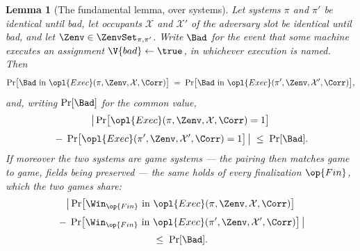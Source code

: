 \documentclass[10pt,oneside,openany]{book}
\theoremstyle{accentdef}
\theoremstyle{accentplain}
\newtheorem{lemma}[definition]{Lemma}
\begin{document}
\begin{lemma}[The fundamental lemma, over systems]\label{lem:iub}
Let systems $\pi$ and $\pi'$ be identical until bad, let occupants $\mathcal{X}$ and
$\mathcal{X}'$ of the adversary slot be identical until bad, and let
$\Zenv \in \ZenvSet_{\pi,\pi'}$. Write $\Bad$ for the event that some machine executes an
assignment $\V{bad} \gets \true$, in whichever execution is named. Then
\[
  \Pr\bigl[\Bad \text{ in } \opl{Exec}(\pi,\Zenv,\mathcal{X},\Corr)\bigr]
  \;=\;
  \Pr\bigl[\Bad \text{ in } \opl{Exec}(\pi',\Zenv,\mathcal{X}',\Corr)\bigr] ,
\]
and, writing $\Pr[\Bad]$ for the common value,
\[
  \begin{gathered}
  \bigl|\, \Pr\bigl[\opl{Exec}(\pi,\Zenv,\mathcal{X},\Corr) = 1\bigr] \\[3pt]
  \;-\; \Pr\bigl[\opl{Exec}(\pi',\Zenv,\mathcal{X}',\Corr) = 1\bigr] \,\bigr|
  \;\leq\; \Pr[\Bad] .
  \end{gathered}
\]
If moreover the two systems are game systems --- the pairing then matches game to game, fields
being preserved --- the same holds of every finalization $\op{Fin}$, which the two games share:
\[
  \begin{gathered}
  \bigl|\, \Pr\bigl[\Win_{\op{Fin}} \text{ in } \opl{Exec}(\pi,\Zenv,\mathcal{X},\Corr)\bigr] \\[3pt]
  \;-\; \Pr\bigl[\Win_{\op{Fin}} \text{ in } \opl{Exec}(\pi',\Zenv,\mathcal{X}',\Corr)\bigr]
  \,\bigr| \\[3pt]
  \;\leq\; \Pr[\Bad] .
  \end{gathered}
\]
\end{lemma}
\end{document}

